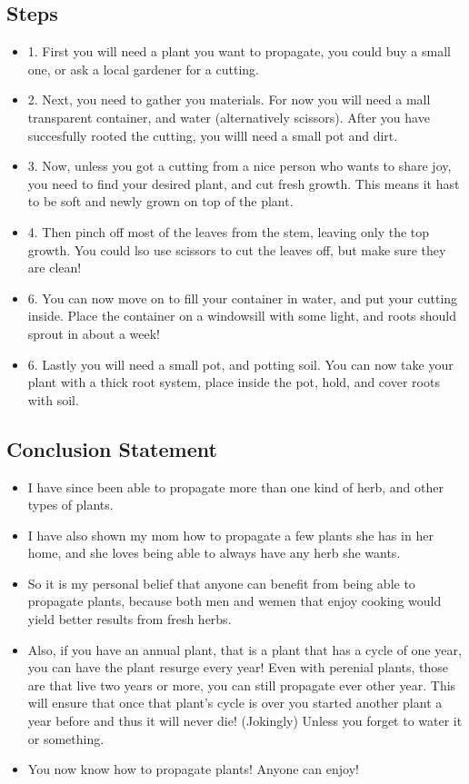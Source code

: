 \documentclass[]{article}
\begin{document}
\subsection{Steps}
\begin{itemize}
	
	\item 1. First you will need a plant you want to propagate, you could buy a small one, or ask a local gardener for a cutting. 	
	\item 2. Next, you need to gather you materials. For now you will need a mall transparent container, and water (alternatively scissors). After you have succesfully rooted the cutting, you willl need a small pot and dirt.
	\item 3. Now, unless you got a cutting from a nice person who wants to share joy, you need to find your desired plant, and cut fresh growth. This means it hast to be soft and newly grown on top of the plant.
	\item 4. Then pinch off most of the leaves from the stem, leaving only the top growth. You could lso use scissors to cut the leaves off, but make sure they are clean!
	\item 6. You can now move on to fill your container in water, and put your cutting inside. Place the container on a windowsill with some light, and roots should sprout in about a week!
	\item 6. Lastly you will need a small pot, and potting soil. You can now take your plant with a thick root system, place inside the pot, hold, and cover roots with soil. 
\end{itemize}

\subsection{Conclusion Statement}
\begin{itemize}
	
	\item I have since been able to propagate more than one kind of herb, and other types of plants. 
	\item I have also shown my mom how to propagate a few plants she has in her home, and  she loves being able to always have any herb she wants. 
	\item So it is my personal belief that anyone can benefit from being able to propagate plants, because both men and wemen that enjoy cooking would yield better results from fresh herbs. 
	\item Also, if you have an annual plant, that is a plant that has a cycle of one year, you can have the plant resurge every year! Even with perenial plants, those are that live two years or more, you can still propagate ever other year. This will ensure that once that plant's cycle is over you started another plant a year before and thus it will never die! (Jokingly) Unless you forget to water it or something.
	\item You now know how to propagate plants! Anyone can enjoy! 
\end{itemize}
\end{document}
